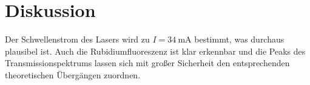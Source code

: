 \section{Diskussion}
\label{sec:Diskussion}
Der Schwellenstrom des Lasers wird zu $I=\qty{34}{\milli\ampere}$ bestimmt, was durchaus plausibel ist.
Auch die Rubidiumfluoreszenz ist klar erkennbar und die Peaks des Transmissionspektrums lassen sich mit großer Sicherheit den entsprechenden
theoretischen Übergängen zuordnen.
